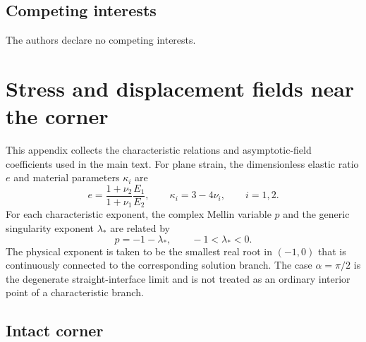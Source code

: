 \documentclass[pdflatex,onecolumn,sn-mathphys-ay]{sn-jnl}
\begin{document}
\subsection*{Competing interests}
The authors declare no competing interests.

\appendix
\section{Stress and displacement fields near the corner}
\label{app:asymptotics}
\providecommand{\SingularityExponentFigure}{Figure~\ref{fig:singularity-exponents}}

\setcounter{equation}{0}
\renewcommand{\theequation}{A.\arabic{equation}}

This appendix collects the characteristic relations and asymptotic-field
coefficients used in the main text. For plane strain, the dimensionless
elastic ratio $e$ and material parameters $\kappa_i$ are
\begin{equation*}
  e=\frac{1+\nu_2}{1+\nu_1}\frac{E_1}{E_2},
  \qquad
  \kappa_i=3-4\nu_i,\qquad i=1,2.
\end{equation*}
For each characteristic exponent, the complex Mellin variable $p$ and
the generic singularity exponent $\lambda_*$ are related by
\begin{equation*}
  p=-1-\lambda_*,
  \qquad -1<\lambda_*<0.
\end{equation*}
The physical exponent is taken to be the smallest real root in
$(-1,0)$ that is continuously connected to the corresponding solution
branch. The case $\alpha=\pi/2$ is the degenerate straight-interface
limit and is not treated as an ordinary interior point of a
characteristic branch.

\subsection{Intact corner}
\end{document}
